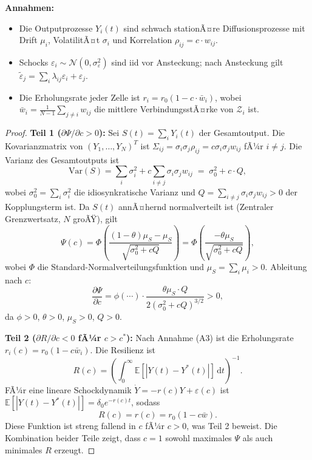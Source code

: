 ﻿\documentclass[a4paper,12pt]{article}
\theoremstyle{definition}
\begin{document}
\noindent\textbf{Annahmen:}
\begin{itemize}
    \item[(A1)] Die Outputprozesse $Y_i(t)$ sind schwach stationÃ¤re Diffusionsprozesse mit
          Drift $\mu_i$, VolatilitÃ¤t $\sigma_i$ und Korrelation $\rho_{ij} = c \cdot w_{ij}$.
    \item[(A2)] Schocks $\varepsilon_i \sim \mathcal{N}(0, \sigma_\varepsilon^2)$ sind
          iid vor Ansteckung; nach Ansteckung gilt
          $\tilde{\varepsilon}_j = \sum_i \lambda_{ij} \varepsilon_i + \varepsilon_j$.
    \item[(A3)] Die Erholungsrate jeder Zelle ist $r_i = r_0 (1 - c \cdot \bar{w}_i)$,
          wobei $\bar{w}_i = \frac{1}{N-1}\sum_{j\neq i} w_{ij}$ die mittlere
          VerbindungsstÃ¤rke von $\mathcal{Z}_i$ ist.
\end{itemize}

\begin{proof}
    \textbf{Teil 1 ($\partial\Psi/\partial c > 0$):}
    Sei $S(t) = \sum_i Y_i(t)$ der Gesamtoutput. Die Kovarianzmatrix von
    $(Y_1,\ldots,Y_N)^T$ ist $\Sigma_{ij} = \sigma_i \sigma_j \rho_{ij} = c \sigma_i \sigma_j w_{ij}$
    fÃ¼r $i \neq j$. Die Varianz des Gesamtoutputs ist
    \[
        \mathrm{Var}(S) = \sum_i \sigma_i^2 + c \sum_{i\neq j} \sigma_i \sigma_j w_{ij}
        \;=\; \sigma_0^2 + c \cdot Q,
    \]
    wobei $\sigma_0^2 = \sum_i \sigma_i^2$ die idiosynkratische Varianz und
    $Q = \sum_{i\neq j} \sigma_i \sigma_j w_{ij} > 0$ der Kopplungsterm ist.
    Da $S(t)$ annÃ¤hernd normalverteilt ist (Zentraler Grenzwertsatz, $N$ groÃŸ), gilt
    \[
        \Psi(c) = \Phi\!\left(\frac{(1-\theta)\mu_S - \mu_S}{\sqrt{\sigma_0^2 + c Q}}\right)
        = \Phi\!\left(\frac{-\theta\mu_S}{\sqrt{\sigma_0^2 + c Q}}\right),
    \]
    wobei $\Phi$ die Standard-Normalverteilungsfunktion und $\mu_S = \sum_i \mu_i > 0$.
    Ableitung nach $c$:
    \[
        \frac{\partial \Psi}{\partial c}
        = \phi\!\left(\cdots\right) \cdot \frac{\theta \mu_S \cdot Q}{2(\sigma_0^2 + cQ)^{3/2}}
        > 0,
    \]
    da $\phi > 0$, $\theta > 0$, $\mu_S > 0$, $Q > 0$.

    \textbf{Teil 2 ($\partial R/\partial c < 0$ fÃ¼r $c > c^*$):}
    Nach Annahme (A3) ist die Erholungsrate $r_i(c) = r_0(1-c\bar{w}_i)$. Die Resilienz ist
    \[
        R(c) = \left(\int_0^\infty \mathbb{E}[|Y(t) - Y^*(t)|]\,\mathrm{d}t\right)^{-1}.
    \]
    FÃ¼r eine lineare Schockdynamik $\dot{Y} = -r(c) Y + \varepsilon(c)$ ist
    $\mathbb{E}[|Y(t)-Y^*(t)|] = \delta_0 e^{-r(c)t}$, sodass
    \[
        R(c) = r(c) = r_0(1 - c\bar{w}).
    \]
    Diese Funktion ist streng fallend in $c$ fÃ¼r $c > 0$, was Teil 2 beweist.
    Die Kombination beider Teile zeigt, dass $c=1$ sowohl maximales $\Psi$ als auch
    minimales $R$ erzeugt.
\end{proof}
\end{document}
